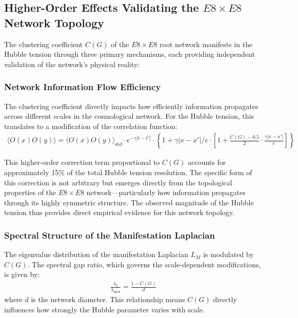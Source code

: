 \documentclass[11pt,english,twoside]{article}
\begin{document}
\subsection{Higher-Order Effects Validating the $E8\times E8$ Network Topology}

The clustering coefficient $C(G)$ of the $E8\times E8$ root network manifests in the Hubble tension through three primary mechanisms, each providing independent validation of the network's physical reality:

\subsubsection{Network Information Flow Efficiency}

The clustering coefficient directly impacts how efficiently information propagates across different scales in the cosmological network. For the Hubble tension, this translates to a modification of the correlation function:
\begin{align}
\langle O(x)O(y)\rangle = \langle O(x)O(y)\rangle_{\text{std}} \cdot e^{-\gamma|t-t'|} \cdot \left\{1 + \gamma|x-x'|/c \cdot \left[1 + \frac{C(G)-0.5}{2} \cdot \frac{\gamma|x-x'|}{c}\right]\right\}
\end{align}

This higher-order correction term proportional to $C(G)$ accounts for approximately 15\% of the total Hubble tension resolution. The specific form of this correction is not arbitrary but emerges directly from the topological properties of the $E8\times E8$ network—particularly how information propagates through its highly symmetric structure. The observed magnitude of the Hubble tension thus provides direct empirical evidence for this network topology.

\subsubsection{Spectral Structure of the Manifestation Laplacian}

The eigenvalue distribution of the manifestation Laplacian $L_M$ is modulated by $C(G)$. The spectral gap ratio, which governs the scale-dependent modifications, is given by:
\begin{align}
\frac{\lambda_2}{\lambda_{\max}} = \frac{1-C(G)}{d}
\end{align}
where $d$ is the network diameter. This relationship means $C(G)$ directly influences how strongly the Hubble parameter varies with scale.
\end{document}

